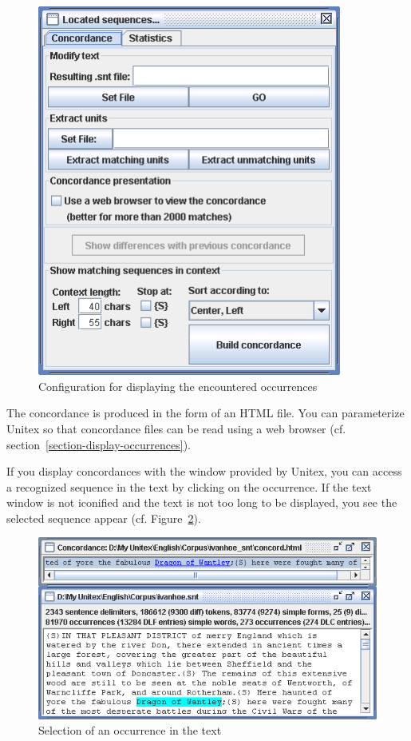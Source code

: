 \bigskip
\begin{figure}[h]
\begin{center}
\includegraphics[width=10cm]{resources/img/fig6-31.png}
\caption{Configuration for displaying the encountered occurrences
\label{fig-configuration-display-occurrences}}
\end{center}
\end{figure}

\noindent The concordance is produced in the form of an HTML file.
 You can parameterize Unitex  so that concordance files 
can be read using a web browser
(cf. section~\ref{section-display-occurrences}).

\bigskip
\noindent If you display concordances with the window provided by Unitex,
you can access a recognized sequence in the text by clicking on the occurrence. If
the text window is not iconified and the text is not too long to be displayed,
you see the selected sequence appear (cf.
Figure~\ref{fig-back-to-text}).

\bigskip
\begin{figure}[h]
\begin{center}
\includegraphics[width=13.5cm]{resources/img/fig6-32.png}
\caption{Selection of an occurrence in the text\label{fig-back-to-text}}
\end{center}
\end{figure}

